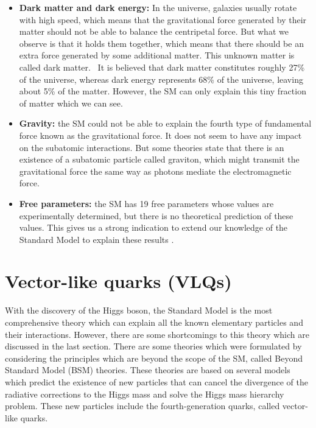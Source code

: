 \begin{itemize}
\item \textbf{Dark matter and dark energy:} In the universe, galaxies usually rotate with high speed, which means that the gravitational force generated by their matter should not be able to balance the centripetal force. But what we observe is that it holds them together, which means that there should be an extra force generated by some additional matter. This unknown matter is called dark matter.~\cite{darkmatter} It is believed that dark matter constitutes roughly 27\% of the universe, whereas dark energy represents 68\% of the universe, leaving about 5\% of the matter. However, the SM can only explain this tiny fraction of matter which we can see.

\item \textbf{Gravity:} the SM could not be able to explain the fourth type of fundamental force known as the gravitational force. It does not seem to have any impact on the subatomic interactions. But some theories state that there is an existence of a subatomic particle called graviton, which might transmit the gravitational force the same way as photons mediate the electromagnetic force.~\cite{drawbacks}

\item \textbf{Free parameters:} the SM has 19 free parameters whose values are experimentally determined, but there is no theoretical prediction of these values. This gives us a strong indication to extend our knowledge of the Standard Model to explain these results \cite{thesis:anji}.
\end{itemize}

\clearpage
\section{Vector-like quarks (VLQs)}%
\label{sec:theory:vectorlikequarks}

With the discovery of the Higgs boson, the Standard Model is the most comprehensive theory which can explain all the known elementary particles and their interactions. However, there are some shortcomings to this theory which are discussed in the last section. There are some theories which were formulated by considering the principles which are beyond the scope of the SM, called Beyond Standard Model (BSM) theories. These theories are based on several models which predict the existence of new particles that can cancel the divergence of the radiative corrections to the Higgs mass and solve the Higgs mass hierarchy problem. These new particles include the fourth-generation quarks, called vector-like quarks.

